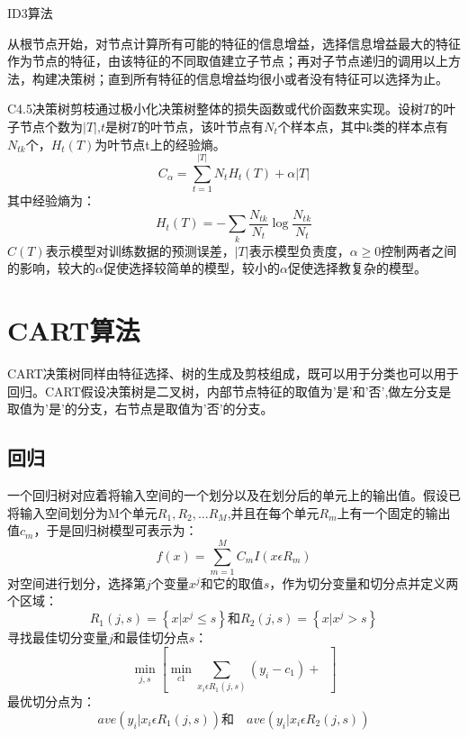 \documentclass{article}
\begin{document}
	\begin{algorithm}[H]
		\caption{ID3算法}
		\LinesNumbered
		从根节点开始，对节点计算所有可能的特征的信息增益，选择信息增益最大的特征作为节点的特征，由该特征的不同取值建立子节点；再对子节点递归的调用以上方法，构建决策树；直到所有特征的信息增益均很小或者没有特征可以选择为止。
	\end{algorithm}
	\vspace{5pt}
	C4.5决策树剪枝通过极小化决策树整体的损失函数或代价函数来实现。设树$T$的叶子节点个数为$|T|$,$t$是树$T$的叶节点，该叶节点有$N_{t}$个样本点，其中k类的样本点有$N_{tk}$个，$H_{t}(T)$为叶节点t上的经验熵。
	\begin{equation}
	C_{\alpha }=\sum_{t=1}^{\left | T \right |}N_{t}H_{t}\left ( T \right )+\alpha \left | T \right |
	\end{equation}
	其中经验熵为：
	\begin{equation}
	H_{t}\left ( T \right )=-\sum_{k}\frac{N_{tk}}{N_{t}}\log \frac{N_{tk}}{N_{t}}
	\end{equation}
	$C(T)$表示模型对训练数据的预测误差，$|T|$表示模型负责度，$\alpha \geq 0$控制两者之间的影响，较大的$\alpha$促使选择较简单的模型，较小的$\alpha$促使选择教复杂的模型。
	
	\section{CART算法}
	CART决策树同样由特征选择、树的生成及剪枝组成，既可以用于分类也可以用于回归。CART假设决策树是二叉树，内部节点特征的取值为'是'和'否',做左分支是取值为'是'的分支，右节点是取值为'否'的分支。
	\subsection{回归}
	一个回归树对应着将输入空间的一个划分以及在划分后的单元上的输出值。假设已将输入空间划分为M个单元$R_{1},R_{2},\ldots R_{M}$,并且在每个单元$R_{m}$上有一个固定的输出值$c_{m}$，于是回归树模型可表示为：
	\begin{equation}
	f\left ( x \right ) = \sum_{m=1}^{M}C_{m}I\left ( x\epsilon R_{m} \right )
	\end{equation}
	对空间进行划分，选择第$j$个变量$x^{j}$和它的取值$s$，作为切分变量和切分点并定义两个区域：
	\begin{equation}
	R_{1}\left ( j,s \right )=\left \{ x|x^{j}\leq s \right \} \text{和} R_{2}\left ( j,s \right )= \left \{ x|x^{j}> s \right \}
	\end{equation}
	寻找最佳切分变量$j$和最佳切分点$s$：
	\begin{equation}
	\mathop{min}_{j,s}\left [ \mathop{min}_{c1}\sum_{x_{i}\epsilon R_{1}(j,s)}\left ( y_{i}-c_{1} \right )+\mathop{c_{2}\sum_{x_{i}\epsilon R_{2}\left ( j,s \right )}\left ( y_{i}-c_{2} \right )^{2}} \right ]
	\end{equation}
	最优切分点为：
	\begin{equation}
	ave\left ( y_{i}|x_{i}\epsilon R_{1}\left ( j,s \right ) \right ) \text{和} \quad ave\left ( y_{i}|x_{i}\epsilon R_{2}\left ( j,s \right ) \right )
	\end{equation}
\end{document}
